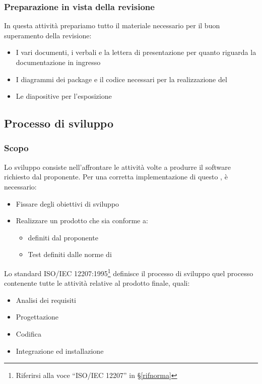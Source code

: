         \subsubsection{Preparazione in vista della revisione}
		In questa attività prepariamo tutto il materiale necessario per il buon superamento della revisione:
		\begin{itemize}
			\item I vari documenti, i verbali e la lettera di presentazione per quanto riguarda la documentazione in ingresso
			\item I diagrammi dei package e il codice necessari per la realizzazione del 
			\item Le diapositive per l'esposizione
		\end{itemize}

    \subsection{Processo di sviluppo}\label{PP:Sviluppo}

		\subsubsection{Scopo}\label{PP:Sviluppo:Scopo}
		Lo sviluppo consiste nell'affrontare le attività volte a produrre il software richiesto dal proponente.
		Per una corretta implementazione di questo , è necessario:
		\begin{itemize}
			\item Fissare degli obiettivi di sviluppo
			\item Realizzare un prodotto che sia conforme a:
			\begin{itemize}
				\item {} definiti dal proponente
				\item Test definiti dalle norme di 
			\end{itemize}
		\end{itemize}
		Lo standard ISO/IEC 12207:1995\footnote{Riferirsi alla voce ``ISO/IEC 12207'' in \S\ref{rifnorma}} definisce il processo di
		sviluppo quel processo contenente tutte le attività relative al prodotto finale, quali:
		\begin{itemize} %
			\item Analisi dei requisiti
			\item Progettazione
			\item Codifica
			\item Integrazione ed installazione
		\end{itemize}


